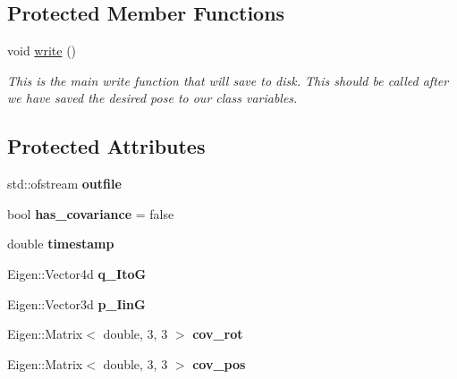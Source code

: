 \subsection*{Protected Member Functions}
\begin{DoxyCompactItemize}
\item 
\mbox{\label{classov__eval_1_1Recorder_a57b309de81ce7312ff3f07125d03ee7a}} 
void \hyperlink{classov__eval_1_1Recorder_a57b309de81ce7312ff3f07125d03ee7a}{write} ()
\begin{DoxyCompactList}\small\item\em This is the main write function that will save to disk. This should be called after we have saved the desired pose to our class variables. \end{DoxyCompactList}\end{DoxyCompactItemize}
\subsection*{Protected Attributes}
\begin{DoxyCompactItemize}
\item 
\mbox{\label{classov__eval_1_1Recorder_ab175907faecd57d895b4e3ac25dba7d5}} 
std\+::ofstream {\bfseries outfile}
\item 
\mbox{\label{classov__eval_1_1Recorder_a3a11f4b799275ea1d0d8790af3085014}} 
bool {\bfseries has\+\_\+covariance} = false
\item 
\mbox{\label{classov__eval_1_1Recorder_a7f094609e17a0251a68a96f19bd8ba18}} 
double {\bfseries timestamp}
\item 
\mbox{\label{classov__eval_1_1Recorder_a3e9cd436f944aeff84ca044644cd9333}} 
Eigen\+::\+Vector4d {\bfseries q\+\_\+\+ItoG}
\item 
\mbox{\label{classov__eval_1_1Recorder_a3fc04158a626ca3d84f4beac6a7c0918}} 
Eigen\+::\+Vector3d {\bfseries p\+\_\+\+IinG}
\item 
\mbox{\label{classov__eval_1_1Recorder_a521ab33ed3681e03f6d03e391c4795a2}} 
Eigen\+::\+Matrix$<$ double, 3, 3 $>$ {\bfseries cov\+\_\+rot}
\item 
\mbox{\label{classov__eval_1_1Recorder_a0a20dbfd92839ebf9455cc4145b96cdb}} 
Eigen\+::\+Matrix$<$ double, 3, 3 $>$ {\bfseries cov\+\_\+pos}
\end{DoxyCompactItemize}


